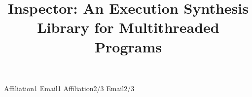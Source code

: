 \documentclass{sigplanconf}
\begin{document}
\title{Inspector: An Execution Synthesis Library for Multithreaded Programs}

           {Affiliation1}
           {Email1}
           {Affiliation2/3}
           {Email2/3}



\maketitle
















\end{document}
